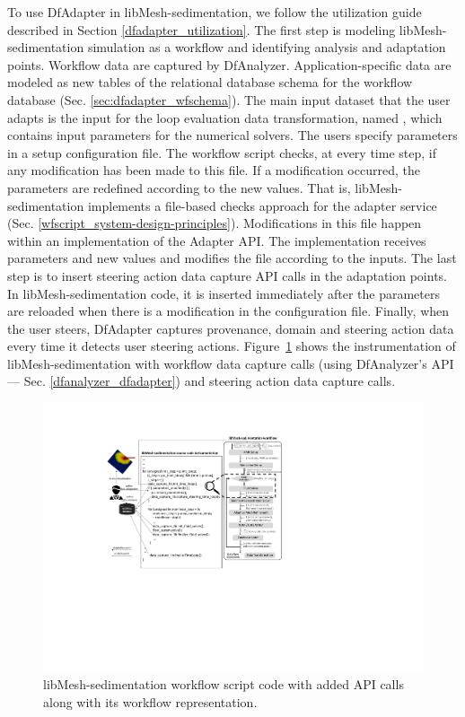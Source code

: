 To use DfAdapter in libMesh-sedimentation, we follow the utilization guide described in Section \ref{dfadapter_utilization}.
The first step is modeling libMesh-sedimentation simulation as a workflow and identifying analysis and adaptation points. Workflow data are captured by DfAnalyzer. Application-specific data are modeled as new tables of the relational database schema for the workflow database (Sec. \ref{sec:dfadapter_wfschema}).
The main input dataset that the user adapts is the input for the loop evaluation data transformation, named , which contains input parameters for the numerical solvers. The users specify parameters in a setup configuration file. The workflow script checks, at every time step, if any modification has been made to this file. If a modification occurred, the parameters are redefined according to the new values. That is, libMesh-sedimentation implements a file-based checks approach for the adapter service (Sec. \ref{wfscript_system-design-principles}).
Modifications in this file happen within an implementation of the Adapter API. The implementation receives parameters and new values and modifies the file according to the inputs.
 The last step is to insert steering action data capture API calls in the adaptation points.
 In libMesh-sedimentation code, it is inserted immediately after the parameters are reloaded when there is a modification in the configuration file.
 Finally, when the user steers, DfAdapter captures provenance, domain and steering action data every time it detects user steering actions.
 Figure~\ref{fig:libmesh_sed_cppode} 
 shows the instrumentation
 of libMesh-sedimentation with workflow data capture calls (using DfAnalyzer's API --- Sec. \ref{dfanalyzer_dfadapter}) and steering action data capture calls.


\begin{figure}[H]
    \centering
    \includegraphics[width=\textwidth,keepaspectratio]{img/libmesh-experiment.pdf}
    \caption{libMesh-sedimentation workflow script code with added API calls along with its  workflow representation.}
    \label{fig:libmesh_sed_cppode}
\end{figure}



